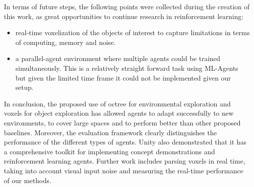     
    
      
    In terms of future steps, the following points were collected during the creation of this work, as great opportunities to continue research in reinforcement learning:
    \begin{itemize}
\item real-time voxelization of the objects of interest to capture limitations in terms of computing, memory and noise.
\item a parallel-agent environment where multiple agents could be trained simultaneously. This is a relatively straight forward task using ML-Agents but given the limited time frame it could not be implemented given our setup.
  
  
    
    
        \end{itemize}

    
    
    
    In conclusion, the proposed use of octree for environmental exploration and voxels for object exploration has allowed agents to adapt successfully to new environments, to cover large spaces and to perform better than other proposed baselines. Moreover, the evaluation framework clearly distinguishes the performance of the different types of agents. Unity also demonstrated that it has a comprehensive toolkit for implementing concept demonstrations and reinforcement learning agents. Further work includes parsing voxels in real time, taking into account visual input noise and measuring the real-time performance of our methods.


